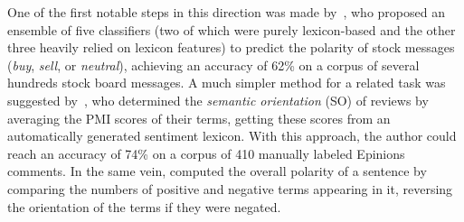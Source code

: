 One of the first notable steps in this direction was made
by~\citet{Das:01}, who proposed an ensemble of five classifiers (two
of which were purely lexicon-based and the other three heavily relied
on lexicon features) to predict the polarity of stock messages
(\emph{buy}, \emph{sell}, or \emph{neutral}), achieving an accuracy of
62\% on a corpus of several hundreds stock board messages.  A much
simpler method for a related task was suggested by~\citet{Turney:02},
who determined the \emph{semantic orientation} (SO) of reviews by
averaging the PMI scores of their terms, getting these scores from an
automatically generated sentiment lexicon.  With this approach, the
author could reach an accuracy of 74\% on a corpus of 410 manually
labeled Epinions comments.  In the same vein, \citet{Hu:04} computed
the overall polarity of a sentence by comparing the numbers of
positive and negative terms appearing in it, reversing the orientation
of the terms if they were negated.  %




